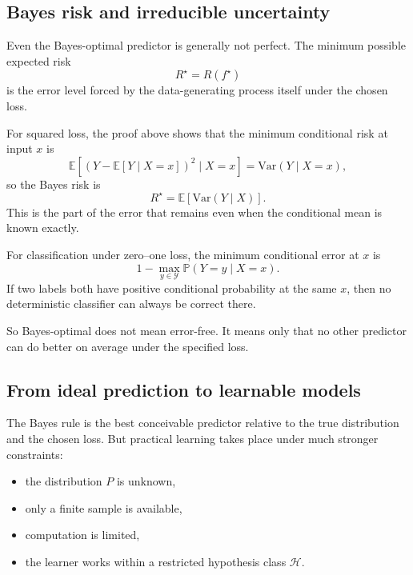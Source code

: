 \subsection*{Bayes risk and irreducible uncertainty}

Even the Bayes-optimal predictor is generally not perfect. The minimum possible expected risk
\[
R^\star=R(f^\star)
\]
is the error level forced by the data-generating process itself under the chosen loss.

For squared loss, the proof above shows that the minimum conditional risk at input $x$ is
\[
\mathbb E\!\left[(Y-\mathbb E[Y\mid X=x])^2 \mid X=x\right]
=
\mathrm{Var}(Y\mid X=x),
\]
so the Bayes risk is
\[
R^\star=\mathbb E[\mathrm{Var}(Y\mid X)].
\]
This is the part of the error that remains even when the conditional mean is known exactly.

For classification under zero--one loss, the minimum conditional error at $x$ is
\[
1-\max_{y\in\mathcal Y}\mathbb P(Y=y\mid X=x).
\]
If two labels both have positive conditional probability at the same $x$, then no deterministic classifier can always be correct there.

So Bayes-optimal does not mean error-free. It means only that no other predictor can do better on average under the specified loss.


\subsection*{From ideal prediction to learnable models}

The Bayes rule is the best conceivable predictor relative to the true distribution and the chosen loss. But practical learning takes place under much stronger constraints:

\begin{itemize}
    \item the distribution $P$ is unknown,
    \item only a finite sample is available,
    \item computation is limited,
    \item the learner works within a restricted hypothesis class $\mathcal H$.
\end{itemize}

